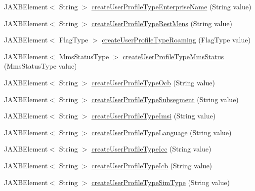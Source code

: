 \begin{DoxyCompactItemize}
JAXBElement$<$ String $>$ \hyperlink{classcom_1_1telefonica_1_1schemas_1_1unica_1_1rest_1_1directory_1_1v1_1_1ObjectFactory_a0fd91bce374e67a0a0eced6fe15fc76b}{createUserProfileTypeEnterpriseName} (String value)
\item 
JAXBElement$<$ String $>$ \hyperlink{classcom_1_1telefonica_1_1schemas_1_1unica_1_1rest_1_1directory_1_1v1_1_1ObjectFactory_a3a9c1521aed6c3054fc16aac856061f2}{createUserProfileTypeRestMens} (String value)
\item 
JAXBElement$<$ FlagType $>$ \hyperlink{classcom_1_1telefonica_1_1schemas_1_1unica_1_1rest_1_1directory_1_1v1_1_1ObjectFactory_a7a878941e2310b46f84766f94f7fcd4e}{createUserProfileTypeRoaming} (FlagType value)
\item 
JAXBElement$<$ MmsStatusType $>$ \hyperlink{classcom_1_1telefonica_1_1schemas_1_1unica_1_1rest_1_1directory_1_1v1_1_1ObjectFactory_aa503d7f6fbdf1c35067a26ccfa36d50b}{createUserProfileTypeMmsStatus} (MmsStatusType value)
\item 
JAXBElement$<$ String $>$ \hyperlink{classcom_1_1telefonica_1_1schemas_1_1unica_1_1rest_1_1directory_1_1v1_1_1ObjectFactory_abe676f31e529bd311c988f33874aeaa5}{createUserProfileTypeOcb} (String value)
\item 
JAXBElement$<$ String $>$ \hyperlink{classcom_1_1telefonica_1_1schemas_1_1unica_1_1rest_1_1directory_1_1v1_1_1ObjectFactory_a06e6a9604e6a4074691874535828fe60}{createUserProfileTypeSubsegment} (String value)
\item 
JAXBElement$<$ String $>$ \hyperlink{classcom_1_1telefonica_1_1schemas_1_1unica_1_1rest_1_1directory_1_1v1_1_1ObjectFactory_a3f4eeee69aa6693582f93306ef305fe5}{createUserProfileTypeImsi} (String value)
\item 
JAXBElement$<$ String $>$ \hyperlink{classcom_1_1telefonica_1_1schemas_1_1unica_1_1rest_1_1directory_1_1v1_1_1ObjectFactory_a34dfa3ddd9e3f260e1db4109b416b6c4}{createUserProfileTypeLanguage} (String value)
\item 
JAXBElement$<$ String $>$ \hyperlink{classcom_1_1telefonica_1_1schemas_1_1unica_1_1rest_1_1directory_1_1v1_1_1ObjectFactory_ad39b09d95497cd4dc566ef0f7bd0f076}{createUserProfileTypeIcc} (String value)
\item 
JAXBElement$<$ String $>$ \hyperlink{classcom_1_1telefonica_1_1schemas_1_1unica_1_1rest_1_1directory_1_1v1_1_1ObjectFactory_abfd61107eb491a2c4357518690469605}{createUserProfileTypeIcb} (String value)
\item 
JAXBElement$<$ String $>$ \hyperlink{classcom_1_1telefonica_1_1schemas_1_1unica_1_1rest_1_1directory_1_1v1_1_1ObjectFactory_a0da78d19ee55d0419d43d4a27358e46e}{createUserProfileTypeSimType} (String value)

\end{DoxyCompactItemize}
